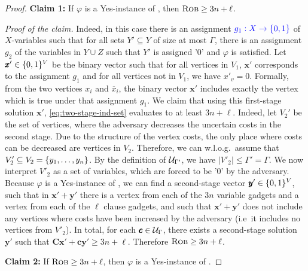 \begin{proof}
\textbf{Claim 1:} If $\varphi$ is a Yes-instance of {\radj}, then $\textsc{Rob} \geq 3n + \ell$. 

\emph{Proof of the claim.} Indeed, in this case there is an assignment $\textcolor{blue}{g_1 : X \to \{ 0,1 \}}$ of $X$-variables such that for all sets $Y' \subseteq Y$ of size at most $\Gamma$, there is an assignment $g_2$ of the variables in $Y \cup Z$ such that $Y'$ is assigned '$0$' and $\varphi$ is satisfied. 
Let $\pmb x' \in \{ 0,1 \}^V$ be the binary vector such that for all vertices in $V_1$, $\pmb x'$ corresponds to the assignment $g_1$ and for all vertices not in $V_1$, we have $x'_v = 0$. Formally, from the two vertices $x_i$ and $\overline{x}_i$, the binary vector $\pmb x'$ includes exactly the vertex which is true under that assignment $g_1$. 
We claim that using this first-stage solution $\pmb x'$, \cref{eq:two-stage-ind-set} evaluates to at least $3n + \ell$. 
Indeed, let $V_2'$ be the set of vertices, where the adversary decreases the uncertain costs in the second stage. 
Due to the structure of the  vertex costs, the only place where costs can be decreased are vertices in $V_2$. Therefore, we can w.l.o.g.\ assume that $V_2' \subseteq V_2 = \{ y_1, \ldots, y_n \}$. 
By the definition of $\mathcal{U}_{\Gamma'}$, we have $|V'_2| \leq \Gamma' = \Gamma$. 
We now interpret $V'_2$ as a set of variables, which are forced to be '0' by the adversary.
Because $\varphi$ is a Yes-instance of {\radj}, we can find a second-stage vector $\pmb y' \in \{ 0,1 \}^V$, such that in $\pmb x' + \pmb y'$ there is a vertex from each of the $3n$ variable gadgets and a vertex from each of the $\ell$ clause gadgets, and such that $\pmb x' + \pmb y'$ does not include any vertices where costs have been increased by the adversary (i.e\ it includes no vertices from $V'_2$). 
In total, for each $\pmb c \in \mathcal{U}_\Gamma$, there exists a second-stage solution $\pmb y'$ such that $\pmb C \pmb x' + \pmb c \pmb y' \geq 3n + \ell$. 
Therefore $\textsc{Rob} \geq 3n + \ell$.

\textbf{Claim 2:} If $\textsc{Rob} \geq 3n + \ell$, then $\varphi$ is a Yes-instance of {\radj}. 


\end{proof}
